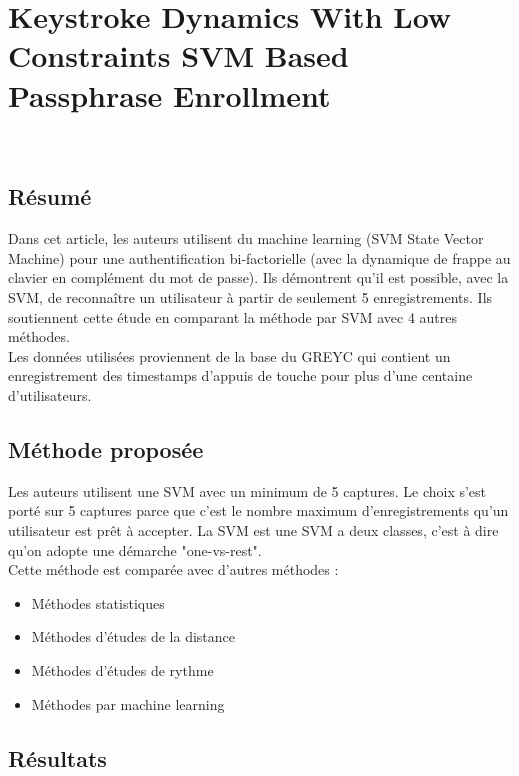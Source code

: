 \section{Keystroke Dynamics With Low Constraints SVM Based Passphrase Enrollment\cite{giotSVM}}

\\

\subsection{Résumé}

Dans cet article, les auteurs utilisent du machine learning (SVM State Vector Machine) pour une authentification bi-factorielle (avec la dynamique de frappe au clavier en complément du mot de passe). Ils démontrent qu'il est possible, avec la SVM, de reconnaître un utilisateur à partir de seulement 5 enregistrements. Ils soutiennent cette étude en comparant la méthode par SVM avec 4 autres méthodes.\\

Les données utilisées proviennent de la base du GREYC qui contient un enregistrement des timestamps d'appuis de touche pour plus d'une centaine d'utilisateurs.

\subsection{Méthode proposée}

Les auteurs utilisent une SVM avec un minimum de 5 captures. Le choix s'est porté sur 5 captures parce que c'est le nombre maximum d'enregistrements qu'un utilisateur est prêt à accepter. La SVM est une SVM a deux classes, c'est à dire qu'on adopte une démarche "one-vs-rest".\\

Cette méthode est comparée avec d'autres méthodes :

\begin{itemize}
  \item Méthodes statistiques
  \item Méthodes d'études de la distance
  \item Méthodes d'études de rythme
  \item Méthodes par machine learning
\end{itemize}

\subsection{Résultats}

